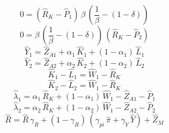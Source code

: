 \begin{dmath}
0=\left({{\hat{R}_{K}}}-{{\hat{P}_{1}}}\right)\, {{\beta}}\, \left(\frac{1}{{{\beta}}}-\left(1-{{\delta}}\right)\right)
\end{dmath}
\begin{dmath}
0={{\beta}}\, \left(\frac{1}{{{\beta}}}-\left(1-{{\delta}}\right)\right)\, \left({{\hat{R}_{K}}}-{{\hat{P}_{2}}}\right)
\end{dmath}
\begin{dmath}
{{\hat{Y}_{1}}}={{\hat{Z}_{A1}}}+{{\alpha_{1}}}\, {{\hat{K}_{1}}}+\left(1-{{\alpha_{1}}}\right)\, {{\hat{L}_{1}}}
\end{dmath}
\begin{dmath}
{{\hat{Y}_{2}}}={{\hat{Z}_{A2}}}+{{\alpha_{2}}}\, {{\hat{K}_{2}}}+\left(1-{{\alpha_{2}}}\right)\, {{\hat{L}_{2}}}
\end{dmath}
\begin{dmath}
{{\hat{K}_{1}}}-{{\hat{L}_{1}}}={{\hat{W}_{1}}}-{{\hat{R}_{K}}}
\end{dmath}
\begin{dmath}
{{\hat{K}_{2}}}-{{\hat{L}_{2}}}={{\hat{W}_{1}}}-{{\hat{R}_{K}}}
\end{dmath}
\begin{dmath}
{{\hat{\lambda}_{1}}}={{\alpha_{1}}}\, {{\hat{R}_{K}}}+\left(1-{{\alpha_{1}}}\right)\, {{\hat{W}_{1}}}-{{\hat{Z}_{A1}}}-{{\hat{P}_{1}}}
\end{dmath}
\begin{dmath}
{{\hat{\lambda}_{2}}}={{\alpha_{2}}}\, {{\hat{R}_{K}}}+\left(1-{{\alpha_{2}}}\right)\, {{\hat{W}_{1}}}-{{\hat{Z}_{A2}}}-{{\hat{P}_{2}}}
\end{dmath}
\begin{dmath}
{{\hat{R}}}={{\hat{R}}}\, {{\gamma_{R}}}+\left(1-{{\gamma_{R}}}\right)\, \left({{\gamma_{pi}}}\, {{\hat{\pi}}}+{{\gamma_{Y}}}\, {{\hat{Y}}}\right)+{{\hat{Z}_M}}
\end{dmath}
